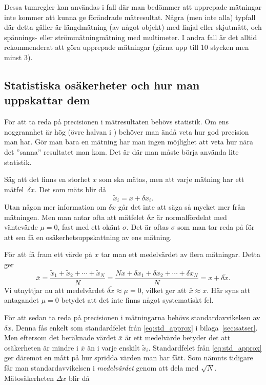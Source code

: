 \documentclass[11pt,a4paper, swedish
]{article}
\begin{document}
Dessa tumregler kan användas i fall där man bedömmer att upprepade
mätningar inte kommer att kunna ge förändrade mätresultat. Några (men
inte alla) typfall där detta gäller är längdmätning (av något objekt)
med linjal eller skjutmått, och spännings- eller strömmätningmätning
med multimeter. I andra fall är det alltid rekommenderat att göra
upprepade mätningar (gärna upp till 10 stycken men minst 3). 


\subsection{Statistiska osäkerheter och hur man uppskattar dem}
För att ta reda på precisionen i mätresultaten behövs statistik. Om
ens noggrannhet är hög (övre halvan i ) behöver
man ändå veta hur god precision man har. Gör man bara en mätning har
man ingen möjlighet att veta hur nära det ''sanna'' resultatet man
kom. Det är där man måste börja använda lite statistik. 

Säg att det finns en storhet $x$ som ska mätas, men att varje mätning
har ett mätfel~$\delta{x}$. Det som mäts blir då
\begin{equation}
\widetilde{x}_i=x+\delta{x}_i.
\end{equation}
Utan någon mer information om $\delta{x}$ går det inte att säga så
mycket mer från mätningen. Men man antar ofta att mätfelet
$\delta{x}$ är normalfördelat\footnotemark{} med väntevärde $\mu=0$,
fast med ett okänt $\sigma$. Det är oftas $\sigma$ som man tar reda på
för att sen få en osäkerhetsuppskattning av ens mätning. 


För att få fram ett värde på $x$ tar man ett medelvärdet av flera
mätningar. Detta ger
\begin{equation}
\bar{x}=\frac{\widetilde{x}_1+\widetilde{x}_2 + \cdots + \widetilde{x}_N}{N} 
= \frac{Nx+\delta{x}_1+\delta{x}_2 + \cdots + \delta{x}_N}{N}
= x + \overline{\delta{x}}.
\end{equation}
Vi utnyttjar nu att medelvärdet
$\overline{\delta{x}}\approx\mu=0$, vilket ger att $\bar{x}\approx x$.
Här syns att antagandet $\mu=0$ betydet att det inte finns något
systematiskt fel.

För att sedan ta reda på precisionen i mätningarna behövs
standardavvikelsen av $\delta{x}$. Denna fås enkelt som standardfelet
från \eqref{eq:std_approx} i bilaga~\ref{sec:satser}. Men eftersom det
beräknade värdet $\bar{x}$ är ett medelvärde betyder det att
osäkerheten är mindre i $\bar{x}$ än i varje enskilt
$\widetilde{x}_i$. Standardfelet från \eqref{eq:std_approx} ger
däremot en mått på hur spridda värden man har fått. Som nämnts
tidigare får man standardavvikelsen i \emph{medelvärdet} genom att
dela med $\sqrt{N}$. Mätosäkerheten\footnotemark{} $\Delta{x}$ blir då
\end{document}
